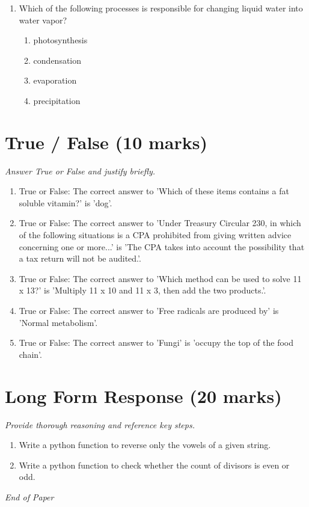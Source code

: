 \documentclass[12pt]{article}
\begin{document}
\begin{enumerate}[label=\arabic*.]
\begin{enumerate}[label=(\alph*)]
    \item reduces the percentage of heat lost to the atmosphere.
\end{enumerate}
\item Which of the following processes is responsible for changing liquid water into water vapor?
\begin{enumerate}[label=(\alph*)]
    \item photosynthesis
    \item condensation
    \item evaporation
    \item precipitation
\end{enumerate}
\end{enumerate}

\section*{True / False (10 marks)}
\textit{Answer True or False and justify briefly.}
\begin{enumerate}[label=\arabic*.]
\item True or False: The correct answer to 'Which of these items contains a fat soluble vitamin?' is 'dog'.
\item True or False: The correct answer to 'Under Treasury Circular 230, in which of the following situations is a CPA prohibited from giving written advice concerning one or more...' is 'The CPA takes into account the possibility that a tax return will not be audited.'.
\item True or False: The correct answer to 'Which method can be used to solve 11 x 13?' is 'Multiply 11 x 10 and 11 x 3, then add the two products.'.
\item True or False: The correct answer to 'Free radicals are produced by' is 'Normal metabolism'.
\item True or False: The correct answer to 'Fungi' is 'occupy the top of the food chain'.
\end{enumerate}

\section*{Long Form Response (20 marks)}
\textit{Provide thorough reasoning and reference key steps.}
\begin{enumerate}[label=\arabic*.]
\item Write a python function to reverse only the vowels of a given string.
\item Write a python function to check whether the count of divisors is even or odd.
\end{enumerate}

\vfill
\noindent\textit{End of Paper}
\end{document}
